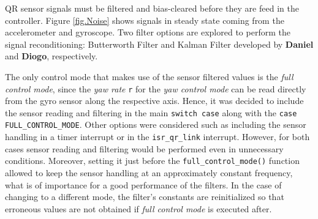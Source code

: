 \documentclass{article}
\begin{document}
QR sensor signals must be filtered and bias-cleared before they are feed in the controller. Figure \ref{fig.Noise} shows signals in steady state coming from the accelerometer and gyroscope. Two filter options are explored to perform the signal reconditioning: Butterworth Filter and Kalman Filter developed by \textbf{Daniel} and \textbf{Diogo}, respectively.

The only control mode that makes use of the sensor filtered values is the \textit{full control mode}, since the \textit{yaw rate} \texttt{r} for the \textit{yaw control mode} can be read directly from the gyro sensor along the respective axis. Hence, it was decided to include the sensor reading and filtering in the main \texttt{switch case} along with the \texttt{case FULL\_CONTROL\_MODE}. Other options were considered such as including the sensor handling in a timer interrupt or in the \texttt{isr\_qr\_link} interrupt. However, for both cases sensor reading and filtering would be performed even in unnecessary conditions. Moreover, setting it just before the \texttt{full\_control\_mode()} function allowed to keep the sensor handling at an approximately constant frequency, what is of importance for a good performance of the filters. In the case of changing to a different mode, the filter's constants are reinitialized so that erroneous values are not obtained if \textit{full control mode} is executed after.
\end{document}
